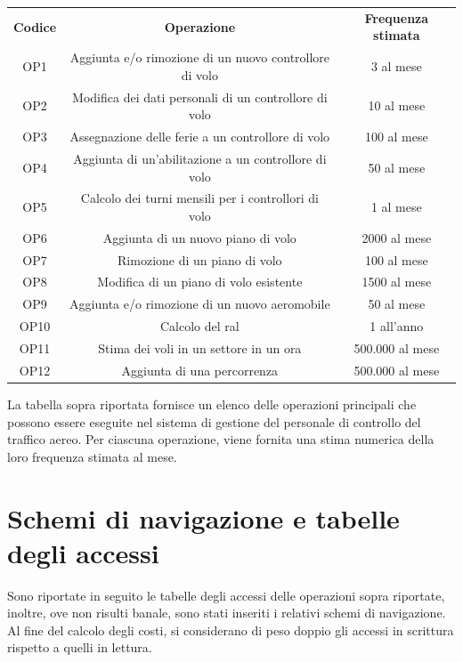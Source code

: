   \begin{table}[H]
  \centering
  \begin{tabular}{ccc}
  \rowcolor{tableheadercolor}
  \textbf{Codice} & \textbf{Operazione} & \textbf{Frequenza stimata} \\

  OP1 & Aggiunta e/o rimozione di un nuovo controllore di volo & 3 al mese \\
  OP2 & Modifica dei dati personali di un controllore di volo & 10 al mese \\
  OP3 & Assegnazione delle ferie a un controllore di volo & 100 al mese \\
  OP4 & Aggiunta di un'abilitazione a un controllore di volo & 50 al mese \\
  OP5 & Calcolo dei turni mensili per i controllori di volo & 1 al mese \\
  OP6 & Aggiunta di un nuovo piano di volo & 2000 al mese \\
  OP7 & Rimozione di un piano di volo & 100 al mese \\
  OP8 & Modifica di un piano di volo esistente & 1500 al mese \\
  OP9 & Aggiunta e/o rimozione di un nuovo aeromobile & 50 al mese \\
  OP10 & Calcolo del ral & 1 all'anno \\
  OP11 & Stima dei voli in un settore in un ora & 500.000 al mese \\
  OP12 & Aggiunta di una percorrenza & 500.000 al mese \\


  \end{tabular}
  \end{table}
  
  La tabella sopra riportata fornisce un elenco delle operazioni principali che possono essere eseguite nel sistema di gestione del personale di controllo del traffico aereo. Per ciascuna operazione, viene fornita una stima numerica della loro frequenza stimata al mese.
\section{Schemi di navigazione e tabelle degli accessi}
Sono riportate in seguito le tabelle degli accessi delle operazioni sopra riportate, inoltre, ove
non risulti banale, sono stati inseriti i relativi schemi di navigazione. Al fine del calcolo degli
costi, si considerano di peso doppio gli accessi in scrittura rispetto a quelli in lettura.

